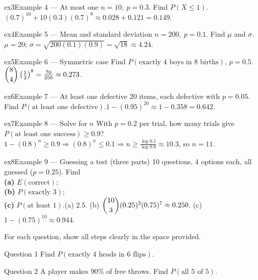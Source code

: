 \documentclass[11pt]{article}
\begin{document}
\begin{example}{ex3}{Example 4 --- At most one}
$n=10,\ p=0.3$. Find $P(X\le1)$.\soln $(0.7)^{10}+10(0.3)(0.7)^9\approx0.028+0.121=0.149$.
\end{example}

\begin{example}{ex4}{Example 5 --- Mean and standard deviation}
$n=200,\ p=0.1$. Find $\mu$ and $\sigma$.\soln $\mu=20$; $\sigma=\sqrt{200(0.1)(0.9)}=\sqrt{18}\approx4.24$.
\end{example}

\begin{example}{ex5}{Example 6 --- Symmetric case}
Find $P(\text{exactly 4 boys in 8 births})$, $p=0.5$.\soln $\dbinom{8}{4}\left(\tfrac12\right)^8=\tfrac{70}{256}\approx0.273$.
\end{example}

\begin{example}{ex6}{Example 7 --- At least one defective}
20 items, each defective with $p=0.05$. Find $P(\text{at least one defective})$.\soln $1-(0.95)^{20}\approx1-0.358=0.642$.
\end{example}

\begin{example}{ex7}{Example 8 --- Solve for $n$}
With $p=0.2$ per trial, how many trials give $P(\text{at least one success})\ge0.9$?\soln $1-(0.8)^n\ge0.9\Rightarrow(0.8)^n\le0.1\Rightarrow n\ge\tfrac{\log0.1}{\log0.8}\approx10.3$, so $n=11$.
\end{example}

\begin{example}{ex8}{Example 9 --- Guessing a test (three parts)}
10 questions, 4 options each, all guessed ($p=0.25$). Find \\ \textbf{(a)} $E(\text{correct})$; \\ \textbf{(b)} $P(\text{exactly 3})$; \\ \textbf{(c)} $P(\text{at least 1})$.\soln (a) $2.5$. (b) $\dbinom{10}{3}(0.25)^3(0.75)^7\approx0.250$. (c) $1-(0.75)^{10}\approx0.944$.
\end{example}

\clearpage
{}
For each question, show all steps clearly in the space provided.

\begin{qbox}{Question 1}
Find $P(\text{exactly 4 heads in 6 flips})$.\workspace{2.4cm}
\end{qbox}

\begin{qbox}{Question 2}
A player makes 90\% of free throws. Find $P(\text{all 5 of 5})$.\workspace{2.4cm}
\end{qbox}
\end{document}
